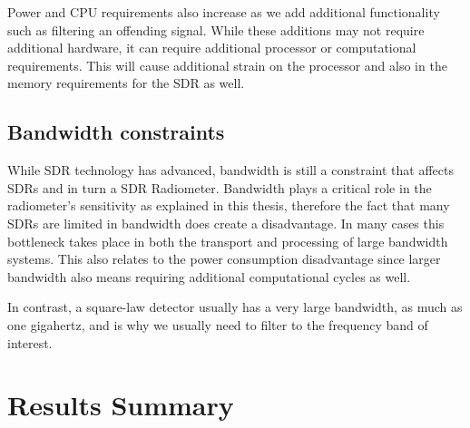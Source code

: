 {Power and CPU requirements also increase as we add additional functionality such as filtering an offending signal.  While these additions may not require additional hardware, it can require additional processor or computational requirements.  This will cause additional strain on the processor and also in the memory requirements for the SDR as well.

\subsection{Bandwidth constraints}
While SDR technology has advanced, bandwidth is still a constraint that affects SDRs and in turn a SDR Radiometer.  Bandwidth plays a critical role in the radiometer's sensitivity as explained in this thesis, therefore the fact that many SDRs are limited in bandwidth does create a disadvantage.  In many cases this bottleneck takes place in both the transport and processing of large bandwidth systems.  This also relates to the power consumption disadvantage since larger bandwidth also means requiring additional computational cycles as well.  

In contrast, a square-law detector usually has a very large bandwidth, as much as one gigahertz, and is why we usually need to filter to the frequency band of interest.  

\section{Results Summary}






}
